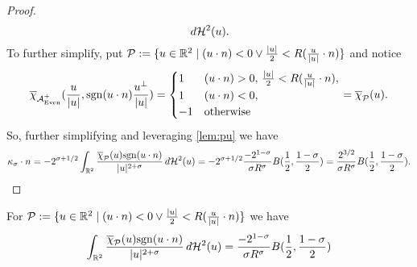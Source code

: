 \documentclass{article}
\newcommand{\haus}[2]{\mathcal{H}^{#1}\parens{#2}}
\newcommand{\R}[1]{\mathbb{R}^{#1}}
\newcommand{\optparens}[1]{\ifthenelse{\equal{#1}{}}{}{\parens{#1}}}
\newcommand{\chit}[2]{\overline{\chi}_{#1}\optparens{#2}}
\newcommand{\A}{\mathcal{A}^{+}}
\newcommand{\Ae}{\A_{\textup{Even}}}
\newcommand{\ks}{\kappa_\sigma}
\newcommand{\B}[1]{B\parens{#1}}
\newcommand{\sgn}[1]{\mathrm{sgn}\parens{#1}}
\newcommand{\Pu}{\mathcal{P}}
\renewcommand{\dot}[2]{{#1}\cdot{#2}}
\newcommand{\pdot}[2]{\parens{\dot{#1}{#2}}}
\begin{document}
\begin{proof}
$$    \, d\haus{2}{u}.
  $$
  To further simplify, put $\Pu := \braces{u \in \R{2} \mid \pdot{u}{n} < 0 \lor \frac{\abs{u}}{2} < R\pdot{\frac{u}{\abs{u}}}{n}}$ and notice
  $$
  \chit{\Ae}{\frac{u}{\abs{u}}, \sgn{\dot{u}{n}} \frac{u^\perp}{\abs{u}}} =
  \begin{cases}
    1 & \pdot{u}{n} > 0, \, \frac{\abs{u}}{2} < R \pdot{\frac{u}{\abs{u}}}{n}, \\
    1 & \pdot{u}{n} < 0, \\
    -1 & \textup{otherwise}
  \end{cases} = \chit{\Pu}{u}.
  $$
  So, further simplifying and leveraging \ref{lem:pu} we have
  $$
  \dot{\ks}{n} = -2^{\sigma+1/2}\int_{\R{2}} \frac{\chit{\Pu}{u}\sgn{\dot{u}{n}}}{\abs{u}^{2+\sigma}} \, d\haus{2}{u} = -2^{\sigma+1/2} \frac{-2^{1-\sigma}}{\sigma R^{\sigma}} \B{\frac{1}{2},\frac{1-\sigma}{2}} = \frac{2^{3/2}}{\sigma R^\sigma} \B{\frac{1}{2}, \frac{1-\sigma}{2}}.
  $$

\end{proof}%
\begin{lemma} \label{lem:pu}
  For $\Pu := \braces{u \in \R{2} \mid \pdot{u}{n} < 0 \lor \frac{\abs{u}}{2} < R\pdot{\frac{u}{\abs{u}}}{n}}$ we have
  $$
  \int_{\R{2}} \frac{\chit{\Pu}{u}\sgn{\dot{u}{n}}}{\abs{u}^{2+\sigma}} \, d\haus{2}{u} = \frac{-2^{1-\sigma}}{\sigma R^{\sigma}} \B{\frac{1}{2}, \frac{1-\sigma}{2}}
  $$
\end{lemma}
\end{document}

